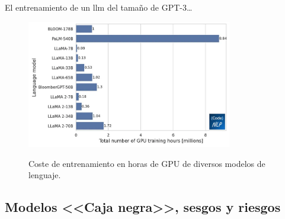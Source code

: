 El entrenamiento de un \gls{llm} del tamaño de GPT-3\dots

\begin{figure}[H]
  \caption[Coste de entrenamiento en horas de GPU de diversos modelos de lenguaje]{Coste de entrenamiento en horas de GPU de diversos modelos de lenguaje.}
  \centering
  \includegraphics[width=0.8\textwidth]{./figuras/llm_gpu_training_hours.png}
  \label{fig:llm_gpu_training_hours}
\end{figure}

\subsection{Modelos <<Caja negra>>, sesgos y riesgos}

